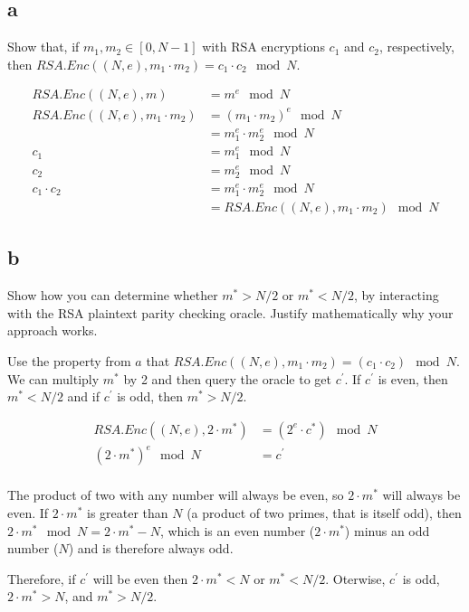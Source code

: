 \documentclass[11pt]{article}
\begin{document}
\subsection{a}

Show that, if $m_1, m_2 \in [0, N-1]$ with RSA encryptions $c_1$ and $c_2$, respectively, then $RSA.Enc((N, e), m_1 \cdot m_2) = c_1 \cdot c_2 \mod N$.

\begin{align*}
    RSA.Enc((N, e), m) &= m^e \mod N \\
    RSA.Enc((N, e), m_1 \cdot m_2) &= (m_1 \cdot m_2)^e \mod N \\
    &= m_1^e \cdot m_2^e \mod N \\
    c_1 &= m_1^e \mod N \\
    c_2 &= m_2^e \mod N \\
    c_1 \cdot c_2 &= m_1^e \cdot m_2^e \mod N \\
    &= RSA.Enc((N, e), m_1 \cdot m_2) \mod N
\end{align*}

\subsection{b}

Show how you can determine whether $m^* > N/2$ or $m^* < N/2$, by interacting with the RSA plaintext parity checking oracle. Justify mathematically why your approach works.

Use the property from $a$ that $RSA.Enc((N, e), m_1 \cdot m_2) = (c_1 \cdot c_2) \mod N$. We can multiply $m^*$ by 2 and then query the oracle to get $c^\prime$. If $c^\prime$ is even, then $m^* < N/2$ and if $c^\prime$ is odd, then $m^* > N/2$.

\begin{align*}
    RSA.Enc((N, e), 2 \cdot m^*) &= (2^e \cdot c^*) \mod N \\
    (2 \cdot m^*)^e \mod N &= c^\prime \\
\end{align*}

The product of two with any number will always be even, so $2 \cdot m^*$ will always be even. If $2 \cdot m^*$ is greater than $N$ (a product of two primes, that is itself odd), then $2 \cdot m^* \mod N = 2 \cdot m^* - N$, which is an even number ($2 \cdot m^*$) minus an odd number ($N$) and is therefore always odd. 

Therefore, if $c^\prime$ will be even then $2 \cdot m^* < N$ or $m^* < N/2$. Oterwise, $c^\prime$ is odd, $2 \cdot m^* > N$, and $m^* > N/2$.
\end{document}
